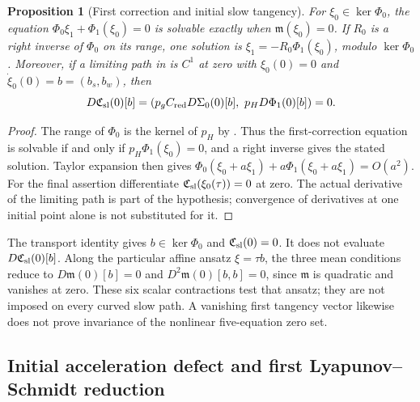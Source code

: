 \documentclass[11pt]{article}
\numberwithin{equation}{section}
\newtheorem{proposition}[proposition]{Proposition}
\theoremstyle{definition}
\theoremstyle{remark}
\begin{document}
\begin{proposition}[First correction and initial slow tangency]
\label{prop:supp-exact-slow-correction}
For $\xi_0\in\ker\Phi_0$, the equation
$\Phi_0\xi_1+\Phi_1(\xi_0)=0$ is solvable exactly when
$\mathfrak m(\xi_0)=0$. If $R_0$ is a right inverse of $\Phi_0$ on its
range, one solution is $\xi_1=-R_0\Phi_1(\xi_0)$, modulo
$\ker\Phi_0$. Moreover, if a limiting path in
 is $C^1$ at zero with
$\xi_0(0)=0$ and $\dot\xi_0(0)=b=(b_s,b_w)$, then
\begin{equation}
 D\mathfrak C_{\rm sl}(0)[b]
       =\left(p_gC_{\rm red}D\Sigma_0(0)[b],\
                    p_HD\Phi_1(0)[b]\right)=0.
 \label{eq:supp-exact-slow-first-tangency}
\end{equation}
\end{proposition}
\begin{proof}
The range of $\Phi_0$ is the kernel of $p_H$ by
. Thus the first-correction equation is
solvable if and only if $p_H\Phi_1(\xi_0)=0$, and a right inverse gives
the stated solution. Taylor expansion then gives
$\Phi_0(\xi_0+a\xi_1)+a\Phi_1(\xi_0+a\xi_1)=O(a^2)$.
For the final assertion differentiate
$\mathfrak C_{\rm sl}(\xi_0(\tau))=0$ at zero. The actual derivative of
the limiting path is part of the hypothesis; convergence of derivatives at
one initial point alone is not substituted for it.
\end{proof}

The transport identity gives $b\in\ker\Phi_0$ and
$\mathfrak C_{\rm sl}(0)=0$. It does not evaluate
$D\mathfrak C_{\rm sl}(0)[b]$. Along the particular affine ansatz
$\xi=\tau b$, the three mean conditions reduce to
$D\mathfrak m(0)[b]=0$ and $D^2\mathfrak m(0)[b,b]=0$, since
$\mathfrak m$ is quadratic and vanishes at zero. These six scalar
contractions test that ansatz; they are not imposed on every curved slow
path. A vanishing first tangency vector likewise does not prove invariance
of the nonlinear five-equation zero set.


\subsection{Initial acceleration defect and first Lyapunov--Schmidt reduction}
\label{subsec:supp-exact-initial-slow-gate}
\end{document}
